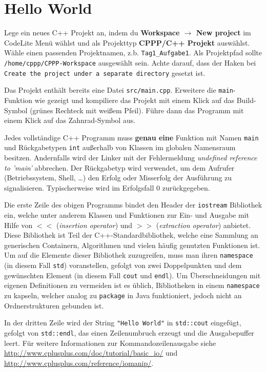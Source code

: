 \section{\ExercisePrefixBasics Hello World}
Lege ein neues C++ Projekt an, indem du \textbf{Workspace $\rightarrow$ New project} im CodeLite Menü wählst und als Projekttyp \textbf{CPPP/C++ Projekt} auswählst.
Wähle einen passenden Projektnamen, z.b. \texttt{Tag1\_Aufgabe1}. Als Projektpfad sollte \texttt{/home/cppp/CPPP-Workspace} ausgewählt sein. Achte darauf, dass der Haken bei \texttt{Create the project under a separate directory} gesetzt ist.

Das Projekt enthält bereits eine Datei \texttt{src/main.cpp}. Erweitere die \texttt{main}-Funktion wie gezeigt und kompiliere das Projekt mit einem Klick auf das Build-Symbol (grünes Rechteck mit weißem Pfeil). Führe dann das Programm mit einem Klick auf das Zahnrad-Symbol aus.


Jedes vollständige C++ Programm muss \textbf{genau eine} Funktion mit Namen \lstinline{main} und Rückgabetypen \lstinline{int} außerhalb von Klassen im globalen Namensraum besitzen.
Andernfalls wird der Linker mit der Fehlermeldung \emph{undefined reference to 'main'} abbrechen.
Der Rückgabetyp wird verwendet, um dem Aufrufer (Betriebssystem, Shell, \dots) den Erfolg oder Misserfolg der Ausführung zu signalisieren.
Typischerweise wird im Erfolgsfall 0 zurückgegeben.

Die erste Zeile des obigen Programms bindet den Header der \lstinline{iostream} Bibliothek ein, welche unter anderem Klassen und Funktionen zur Ein- und Ausgabe mit Hilfe von $<<$ (\emph{insertion operator}) und $>>$ (\emph{extraction operator}) anbietet.
Diese Bibliothek ist Teil der C++-Standardbibliothek, welche eine Sammlung an generischen Containern, Algorithmen und vielen häufig genutzten Funktionen ist.
Um auf die Elemente dieser Bibliothek zuzugreifen, muss man ihren \lstinline{namespace} (in diesem Fall \lstinline{std}) voranstellen, gefolgt von zwei Doppelpunkten und dem gewünschten Element (in diesem Fall \lstinline{cout} und \lstinline{endl}).
Um Überschneidungen mit eigenen Definitionen zu vermeiden ist es üblich, Bibliotheken in einem \lstinline{namespace} zu kapseln, welcher analog zu \lstinline{package} in Java funktioniert, jedoch nicht an Ordnerstrukturen gebunden ist.

In der dritten Zeile wird der String \lstinline{"Hello World"} in \lstinline{std::cout} eingefügt, gefolgt von \lstinline{std::endl}, das einen Zeilenumbruch erzeugt und die Ausgabepuffer leert. Für weitere Informationen zur Kommandozeilenausgabe siehe \url{http://www.cplusplus.com/doc/tutorial/basic_io/} und \url{http://www.cplusplus.com/reference/iomanip/}.

